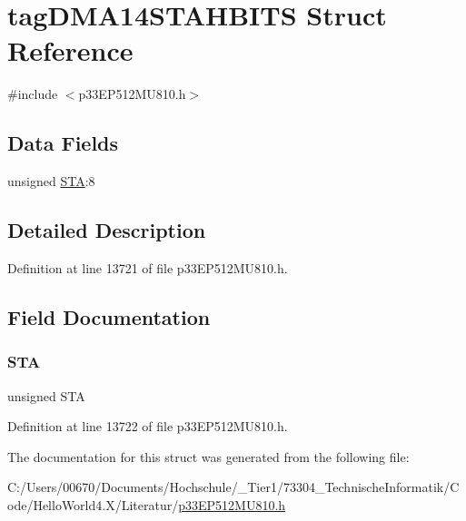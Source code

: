 \hypertarget{structtag_d_m_a14_s_t_a_h_b_i_t_s}{}\section{tag\+D\+M\+A14\+S\+T\+A\+H\+B\+I\+TS Struct Reference}
\label{structtag_d_m_a14_s_t_a_h_b_i_t_s}


{\ttfamily \#include $<$p33\+E\+P512\+M\+U810.\+h$>$}

\subsection*{Data Fields}
\begin{DoxyCompactItemize}
\item 
unsigned \hyperlink{structtag_d_m_a14_s_t_a_h_b_i_t_s_a0eec78ddd2c12af678d5fab70fe62d14}{S\+TA}\+:8
\end{DoxyCompactItemize}


\subsection{Detailed Description}


Definition at line 13721 of file p33\+E\+P512\+M\+U810.\+h.



\subsection{Field Documentation}
\mbox{\label{structtag_d_m_a14_s_t_a_h_b_i_t_s_a0eec78ddd2c12af678d5fab70fe62d14}} 
\subsubsection{\texorpdfstring{S\+TA}{STA}}
{\footnotesize\ttfamily unsigned S\+TA}



Definition at line 13722 of file p33\+E\+P512\+M\+U810.\+h.



The documentation for this struct was generated from the following file\+:\begin{DoxyCompactItemize}
\item 
C\+:/\+Users/00670/\+Documents/\+Hochschule/\+\_\+\+Tier1/73304\+\_\+\+Technische\+Informatik/\+Code/\+Hello\+World4.\+X/\+Literatur/\hyperlink{p33_e_p512_m_u810_8h}{p33\+E\+P512\+M\+U810.\+h}\end{DoxyCompactItemize}
